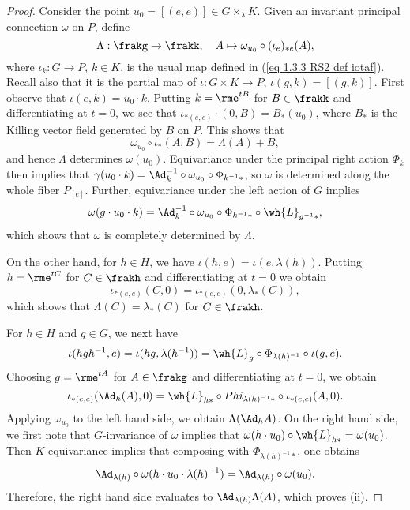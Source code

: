 \begin{proof}
    Consider the point $u_0=[(e,e)]\in G\times_\lambda K$. Given an invariant principal connection $\omega$ on $P$, define 
    \[\Lambda:\frakg\to \frakk,\quad A\mapsto \omega_{u_0}\circ (\iota_e)_{\ast e}(A),\]
    where $\iota_k:G\to P$, $k\in K$, is the usual map defined in (\ref{eq 1.3.3 RS2 def iotaf}). Recall also that it is the partial map of $\iota:G\times K\to P$, $\iota(g,k)=[(g,k)]$. First observe that $\iota(e,k)=u_0\cdot k$. Putting $k=\rme^{tB}$ for $B\in\frakk$ and differentiating at $t=0$, we see that $\iota_{\ast(e,e)}\cdot (0,B)=B_{\ast}(u_0)$, where $B_\ast$ is the Killing vector field generated by $B$ on $P$.  This shows that 
    \[\omega_{u_0}\circ \iota_\ast(A,B)=\Lambda(A)+B,\label{4797}\] 
    and hence $\Lambda$ determines $\omega(u_0)$. Equivariance under the principal right action $\Phi_k$ then implies that $\gamma(u_0\cdot k)=\Ad_k^{-1}\circ \omega_{u_0}\circ \Phi_{k^{-1}\ast}$, so $\omega$ is determined along the whole fiber $P_{[e]}$. Further, equivariance under the left action of $G$ implies 
    \[\omega(g\cdot u_0\cdot k)=\Ad_k^{-1}\circ \omega_{u_0}\circ \Phi_{k^{-1}\ast}\circ \wh{L}_{g^{-1}\ast},\label{eq 1.10 Cap}\]
    which shows that $\omega$ is completely determined by $\Lambda$.

    On the other hand, for $h\in H$, we have $\iota(h,e)=\iota(e,\lambda(h))$. Putting $h=\rme^{tC}$ for $C\in\frakh$ and differentiating at $t=0$ we obtain 
    \[\iota_{\ast(e,e)}(C,0)=\iota_{\ast(e,e)}(0,\lambda_\ast(C)),\]
    which shows that $\Lambda(C)=\lambda_\ast(C)$ for $C\in\frakh$.

    For $h\in H$ and $g\in G$, we next have 
    \[\iota(hgh^{-1},e)=\iota(hg,\lambda(h^{-1}))=\wh{L}_g\circ \Phi_{\lambda(h)^{-1}}\circ \iota(g,e).\]
    Choosing $g=\rme^{tA}$ for $A\in\frakg$ and differentiating at $t=0$, we obtain 
    \[\iota_{\ast(e,e)}(\Ad_h(A),0)=\wh{L}_{h\ast}\circ Phi_{\lambda(h)^{-1}\ast}\circ \iota_{\ast(e,e)}(A,0).\]
    Applying $\omega_{u_0}$ to the left hand side, we obtain $\Lambda(\Ad_h A)$. On the right hand side, we first note that $G$-invariance of $\omega$ implies that $\omega(h\cdot u_0)\circ \wh{L}_{h\ast}=\omega(u_0)$. Then $K$-equivariance implies that composing with $\Phi_{\lambda(h)^{-1}\ast}$, one obtains 
    \[\Ad_{\lambda(h)}\circ \omega(h\cdot u_0\cdot \lambda(h)^{-1})=\Ad_{\lambda(h)}\circ \omega(u_0).\]
    Therefore, the right hand side evaluates to $\Ad_{\lambda(h)}\Lambda(A)$, which proves (ii).


\end{proof}
